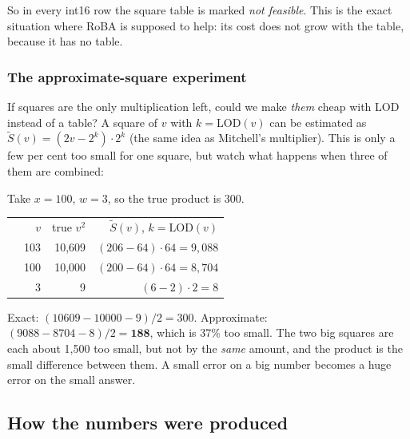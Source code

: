 So in every int16 row the square table is marked \emph{not feasible}. This is the exact situation where RoBA is
supposed to help: its cost does not grow with the table, because it has no table.

\subsubsection*{The approximate-square experiment}

If squares are the only multiplication left, could we make \emph{them} cheap with LOD instead of a table? A
square of $v$ with $k = \mathrm{LOD}(v)$ can be estimated as $\tilde S(v) = (2v - 2^k)\cdot 2^k$ (the same idea
as Mitchell's multiplier). This is only a few per cent too small for one square, but watch what happens when
three of them are combined:

\begin{example}
Take $x = 100$, $w = 3$, so the true product is 300.

\begin{tabular}{lrrr}
 & $v$ & true $v^2$ & $\tilde S(v)$, $k=\mathrm{LOD}(v)$\\
 & 103 & 10{,}609 & $(206 - 64)\cdot 64 = 9{,}088$\\
 & 100 & 10{,}000 & $(200 - 64)\cdot 64 = 8{,}704$\\
 & 3 & 9 & $(6 - 2)\cdot 2 = 8$\\
\end{tabular}

Exact: $(10609 - 10000 - 9)/2 = 300$. Approximate: $(9088 - 8704 - 8)/2 = \mathbf{188}$, which is 37\% too small.
The two big squares are each about 1{,}500 too small, but not by the \emph{same} amount, and the product is the
small difference between them. A small error on a big number becomes a huge error on the small answer.
\end{example}

\subsection{How the numbers were produced}

